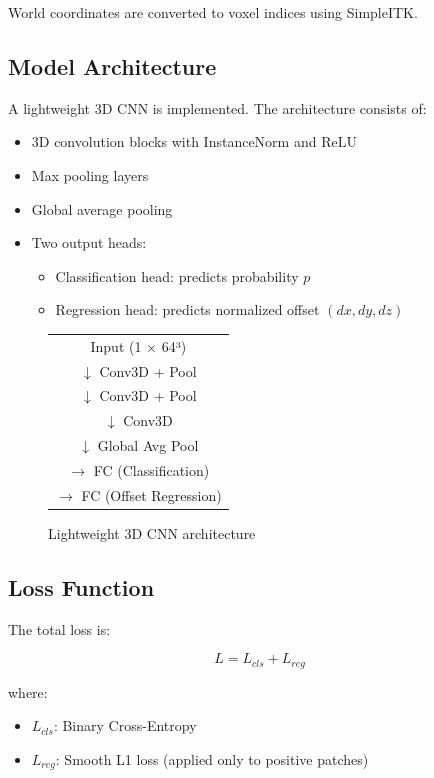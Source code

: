 \documentclass[conference]{IEEEtran}
\begin{document}
World coordinates are converted to voxel indices using SimpleITK.

\subsection{Model Architecture}

A lightweight 3D CNN is implemented. The architecture consists of:

\begin{itemize}
    \item 3D convolution blocks with InstanceNorm and ReLU
    \item Max pooling layers
    \item Global average pooling
    \item Two output heads:
    \begin{itemize}
        \item Classification head: predicts probability $p$
        \item Regression head: predicts normalized offset $(dx, dy, dz)$
    \end{itemize}
\end{itemize}

\begin{figure}[H]
\centering
\begin{tabular}{c}
Input (1 × 64³) \\
$\downarrow$ Conv3D + Pool \\
$\downarrow$ Conv3D + Pool \\
$\downarrow$ Conv3D \\
$\downarrow$ Global Avg Pool \\
$\rightarrow$ FC (Classification) \\
$\rightarrow$ FC (Offset Regression)
\end{tabular}
\caption{Lightweight 3D CNN architecture}
\end{figure}

\subsection{Loss Function}

The total loss is:

\[
L = L_{cls} + L_{reg}
\]

where:

\begin{itemize}
    \item $L_{cls}$: Binary Cross-Entropy
    \item $L_{reg}$: Smooth L1 loss (applied only to positive patches)
\end{itemize}
\end{document}
